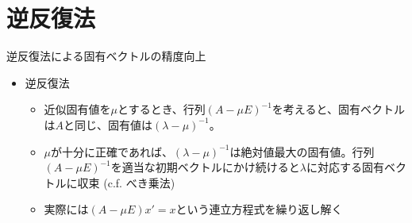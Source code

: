 \section{逆反復法}

\begin{frame}[t,fragile]{逆反復法による固有ベクトルの精度向上}
  \begin{itemize}
  \item 逆反復法
    \begin{itemize}
    \item 近似固有値を$\mu$とするとき、行列$(A - \mu E)^{-1}$を考えると、固有ベクトルは$A$と同じ、固有値は$(\lambda-\mu)^{-1}$。
    \item $\mu$が十分に正確であれば、$(\lambda-\mu)^{-1}$は絶対値最大の固有値。行列$(A - \mu E)^{-1}$を適当な初期ベクトルにかけ続けると$\lambda$に対応する固有ベクトルに収束 (c.f. べき乗法)
    \item 実際には$(A-\mu E) x' = x$という連立方程式を繰り返し解く
    \end{itemize}
  \end{itemize}
\end{frame}
